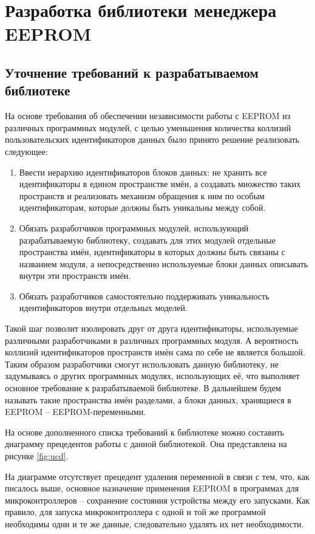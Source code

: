 \chapter{Разработка библиотеки менеджера EEPROM}

\section{Уточнение требований к разрабатываемом библиотеке}

На основе требования об обеспечении независимости работы с EEPROM из различных программных модулей, с целью уменьшения количества коллизий пользовательских идентификаторов данных было принято решение реализовать следующее:
\begin{enumerate}
	\item Ввести иерархию идентификаторов блоков данных: не хранить все идентификаторы в едином пространстве имён, а создавать множество таких пространств и реализовать механизм обращения к ним по особым идентификаторам, которые должны быть уникальны между собой.
	\item Обязать разработчиков программных модулей, использующий разрабатываемую библиотеку, создавать для этих модулей отдельные пространства имён, идентификаторы в которых должны быть связаны с названием модуля, а непосредственно используемые блоки данных описывать внутри эти пространств имён.
	\item Обязать разработчиков самостоятельно поддерживать уникальность идентификаторов внутри отдельных моделей.
\end{enumerate}
Такой шаг позволит изолировать друг от друга идентификаторы, используемые различными разработчиками в различных программных модуля.
А вероятность коллизий идентификаторов пространств имён сама по себе не является большой.
Таким образом разработчики смогут использовать данную библиотеку, не задумываясь о других программных модулях, использующих её, что выполняет основное требование к разрабатываемой библиотеке.
В дальнейшем будем называть такие пространства имён разделами, а блоки данных, хранящиеся в EEPROM -- EEPROM-переменными.

На основе дополненного списка требований к библиотеке можно составить диаграмму прецедентов работы с данной библиотекой. Она представлена на рисунке \ref{fig:ucd}.


На диаграмме отсутствует прецедент удаления переменной в связи с тем, что, как писалось выше, основное назначение применения EEPROM в программах для  микроконтроллеров -- сохранение состояния устройства между его запусками.
Как правило, для запуска микроконтроллера с одной и той же программой необходимы одни и те же данные, следовательно удалять их нет необходимости.

